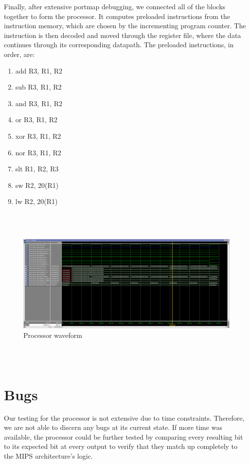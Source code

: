 \documentclass{article}
\begin{document}
Finally, after extensive portmap debugging, we connected all of the blocks together to form the processor. It computes preloaded instructions from the instruction memory, which are chosen by the incrementing program counter. The instruction is then decoded and moved through the register file, where the data continues through its corresponding datapath. The preloaded instructions, in order, are:
\begin{enumerate}
	\item add R3, R1, R2
	\item sub R3, R1, R2
	\item and R3, R1, R2
	\item or R3, R1, R2
	\item xor R3, R1, R2
	\item nor R3, R1, R2
	\item slt R1, R2, R3
	\item sw R2, 20(R1)
	\item lw R2, 20(R1)
\end{enumerate}

\\ \\
\begin{figure}[!ht]
	\centering
		\includegraphics[width=1\textwidth]{processor_waveform.png}
		\caption{Processor waveform}
\end{figure}
\\ \\
 
\section{Bugs}
Our testing for the processor is not extensive due to time constraints. Therefore, we are not able to discern any bugs at its current state. If more time was available, the processor could be further tested by comparing every resulting bit to its expected bit at every output to verify that they match up completely to the MIPS architecture's logic. 
\end{document}
